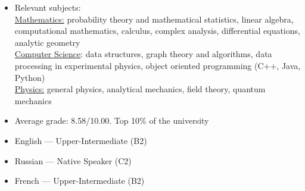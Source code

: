 \documentclass[10pt,a4paper,ragged2e]{altacv}
\begin{document}

\begin{itemize}
\item Relevant subjects: \\
	\underline{Mathematics:} probability theory and mathematical statistics, linear algebra, computational mathematics, calculus, complex analysis, differential equations, analytic geometry\\
	\underline{Computer Science}: data structures, graph theory and algorithms, data processing in experimental physics, object oriented programming (C++, Java, Python)\\
	\underline{Physics:} general physics, analytical mechanics, field theory, quantum mechanics\\
\item Average grade: 8.58/10.00. Top 10\% of the university
\end{itemize}

%



\begin{itemize}
	\item English --- Upper-Intermediate (B2)
	\item Russian --- Native Speaker (C2)
	\item French --- Upper-Intermediate (B2)
\end{itemize}





\end{document}
